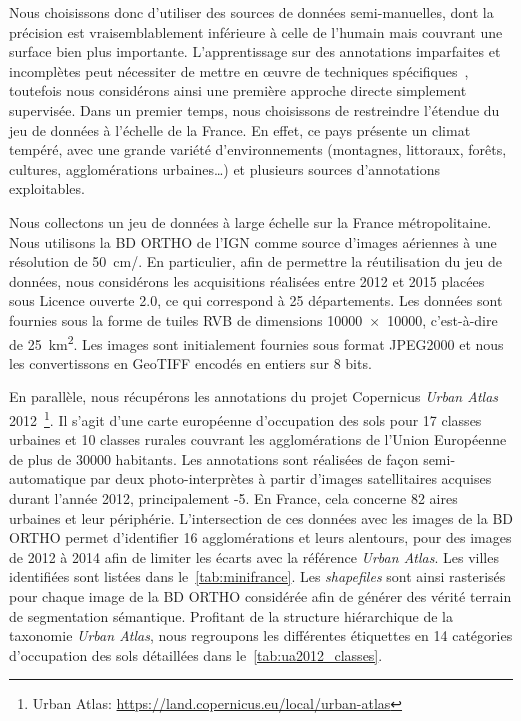 Nous choisissons donc d'utiliser des sources de données semi-manuelles, dont la précision est vraisemblablement inférieure à celle de l'humain mais couvrant une surface bien plus importante. L'apprentissage sur des annotations imparfaites et incomplètes peut nécessiter de mettre en \oe{}uvre de techniques spécifiques~\cite{lu_learning_2017}, toutefois nous considérons ainsi une première approche directe simplement supervisée. Dans un premier temps, nous choisissons de restreindre l'étendue du jeu de données à l'échelle de la France. En effet, ce pays présente un climat tempéré, avec une grande variété d'environnements (montagnes, littoraux, forêts, cultures, agglomérations urbaines\dots) et plusieurs sources d'annotations exploitables.

Nous collectons un jeu de données à large échelle sur la France métropolitaine. Nous utilisons la BD ORTHO de l'\gls{IGN} comme source d'images aériennes à une résolution de \SI{50}{\centi\meter/\px}. En particulier, afin de permettre la réutilisation du jeu de données, nous considérons les acquisitions réalisées entre 2012 et 2015 placées sous Licence ouverte 2.0, ce qui correspond à 25 départements. Les données sont fournies sous la forme de tuiles \gls{RVB} de dimensions \SI{10000x10000}{\px}, c'est-à-dire de \SI{25}{\kilo\meter\squared}. Les images sont initialement fournies sous format JPEG2000 et nous les convertissons en GeoTIFF encodés en entiers sur 8 bits.

En parallèle, nous récupérons les annotations du projet Copernicus \emph{Urban Atlas} 2012~\footnote{Urban Atlas: \url{https://land.copernicus.eu/local/urban-atlas}}. Il s'agit d'une carte européenne d'occupation des sols pour 17 classes urbaines et 10 classes rurales couvrant les agglomérations de l'Union Européenne de plus de \num{30000} habitants. Les annotations sont réalisées de façon semi-automatique par deux photo-interprètes à partir d'images satellitaires acquises durant l'année 2012, principalement -5. En France, cela concerne 82 aires urbaines et leur périphérie. L'intersection de ces données avec les images de la BD ORTHO permet d'identifier 16 agglomérations et leurs alentours, pour des images de 2012 à 2014 afin de limiter les écarts avec la référence \emph{Urban Atlas}. Les villes identifiées sont listées dans le~\cref{tab:minifrance}. Les \emph{shapefiles} sont ainsi rasterisés pour chaque image de la BD ORTHO considérée afin de générer des vérité terrain de segmentation sémantique. Profitant de la structure hiérarchique de la taxonomie \emph{Urban Atlas}, nous regroupons les différentes étiquettes en 14 catégories d'occupation des sols détaillées dans le~\cref{tab:ua2012_classes}.

